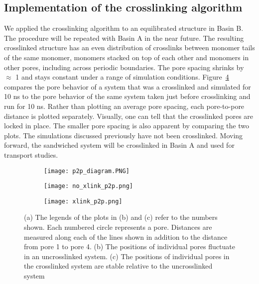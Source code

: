 \subsection*{Implementation of the crosslinking algorithm}

We applied the crosslinking algorithm to an equilibrated structure in Basin B.
The procedure will be repeated with Basin A in the near future.
The resulting crosslinked structure has an even distribution of
crosslinks between monomer tails of the same monomer, monomers stacked on  %
top of each other and monomers in other pores, including across periodic
boundaries. The pore spacing shrinks by $\approx$ 1 \angstrom and stays 
constant under a range of simulation conditions. Figure~\ref{fig:xlink} compares
the pore behavior of a system that was a crosslinked and simulated for 10 ns to 
the pore behavior of the same system taken just before crosslinking and run for 10 ns.
Rather than plotting an average pore spacing, each pore-to-pore distance is plotted
separately. Visually, one can tell that the crosslinked pores are locked in place. 
The smaller pore spacing is also apparent by comparing the two plots. 
The simulations discussed previously have not been crosslinked. Moving forward,
the sandwiched system will be crosslinked in Basin A and used for
transport studies.

\begin{figure}[H]
	\centering
	\begin{subfigure}{0.31\textwidth}
		\centering
		\texttt{[image: p2p\_diagram.PNG]}
		\caption{}\label{fig:p2p_diagram}
	\end{subfigure}
		\begin{subfigure}{0.31\textwidth}
		\centering
		\texttt{[image: no\_xlink\_p2p.png]}
		\caption{}\label{fig:no_xlink_p2p}
	\end{subfigure}
		\begin{subfigure}{0.31\textwidth}
		\centering
		\texttt{[image: xlink\_p2p.png]}
		\caption{}\label{fig:xlink_p2p}
	\end{subfigure}
	\caption{(a) The legends of the plots in (b) and (c) refer to the numbers shown.
	Each numbered circle represents a pore. Distances are measured along each of the 
	lines shown in addition to the distance from pore 1 to pore 4. (b) The positions
	of individual pores fluctuate in an uncrosslinked system. (c) The positions of
	individual pores in the crosslinked system are stable relative to the uncrosslinked
	system}\label{fig:xlink}
\end{figure}

